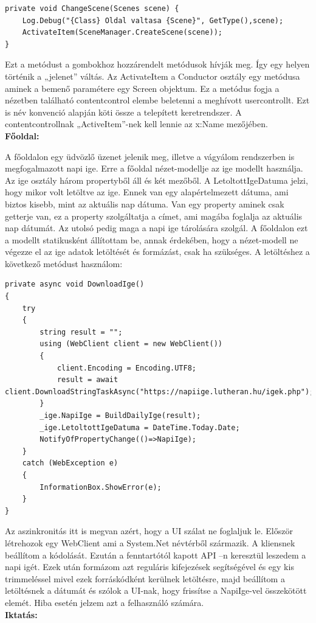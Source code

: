 \documentclass[
]{thesis-ekf}
\theoremstyle{definition}
\theoremstyle{remark}
\begin{document}
\begin{lstlisting}[showstringspaces=false,caption={Nézet váltás metódusa},captionpos=b]
private void ChangeScene(Scenes scene) {
	Log.Debug("{Class} Oldal valtasa {Scene}", GetType(),scene);
	ActivateItem(SceneManager.CreateScene(scene));
}
\end{lstlisting}
Ezt a metódust a gombokhoz hozzárendelt metódusok hívják meg. Így egy helyen történik a „jelenet” váltás. Az ActivateItem a Conductor osztály egy metódusa aminek a bemenő paramétere egy Screen objektum. Ez a metódus fogja a nézetben található contentcontrol elembe beletenni a meghívott usercontrollt. Ezt is név konvenció alapján köti össze a telepített keretrendszer. A contentcontrollnak „ActiveItem”-nek kell lennie az x:Name mezőjében.\\
\textbf{Főoldal:}

A főoldalon egy üdvözlő üzenet jelenik meg, illetve a vágyálom rendszerben is megfogalmazott napi ige. Erre a főoldal nézet-modellje az ige modellt használja. Az ige osztály három propertyből áll és két mezőből. A LetoltottIgeDatuma jelzi, hogy mikor volt letöltve az ige. Ennek van egy alapértelmezett dátuma, ami biztos kisebb, mint az aktuális nap dátuma. Van egy property aminek csak getterje van, ez a property szolgáltatja a címet, ami magába foglalja az aktuális nap dátumát. Az utolsó pedig maga a napi ige tárolására szolgál. A főoldalon ezt a modellt statikusként állítottam be, annak érdekében, hogy a nézet-modell ne végezze el az ige adatok letöltését és formázást, csak ha szükséges. A letöltéshez a következő metódust használom:
\begin{lstlisting}[caption={Ige letöltése és formázása.},captionpos=b]
private async void DownloadIge()
{
	try
	{
		string result = "";
		using (WebClient client = new WebClient())
		{
			client.Encoding = Encoding.UTF8;
			result = await client.DownloadStringTaskAsync("https://napiige.lutheran.hu/igek.php");
		}
		_ige.NapiIge = BuildDailyIge(result);
		_ige.LetoltottIgeDatuma = DateTime.Today.Date;
		NotifyOfPropertyChange(()=>NapiIge);
	}
	catch (WebException e)
	{
		InformationBox.ShowError(e);
	}
}
\end{lstlisting}
Az aszinkronitás itt is megvan  azért, hogy a UI szálat ne foglaljuk le. Először létrehozok egy WebClient ami a System.Net névtérből származik. A kliensnek beállítom a kódolását. Ezután a fenntartótól kapott API –n keresztül leszedem a napi igét. Ezek után formázom azt reguláris kifejezések segítségével és egy kis trimmeléssel mivel ezek forráskódként kerülnek letöltésre, majd beállítom a letöltésnek a dátumát és szólok a UI-nak, hogy frissítse a NapiIge-vel összekötött elemét. Hiba esetén jelzem azt a felhasználó számára.\\
\textbf{Iktatás:}
\end{document}
